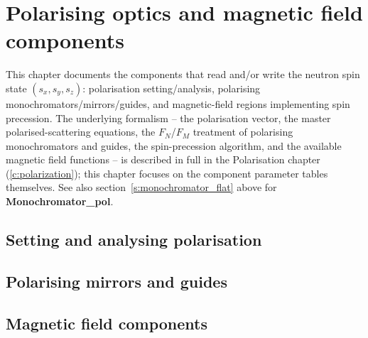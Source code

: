 \chapter{Polarising optics and magnetic field components}
\label{sec:polarising-optics}

This chapter documents the components that read and/or write the neutron
spin state $(s_x,s_y,s_z)$: polarisation setting/analysis, polarising
monochromators/mirrors/guides, and magnetic-field regions implementing
spin precession. The underlying formalism -- the polarisation vector,
the master polarised-scattering equations, the $F_N$/$F_M$ treatment of
polarising monochromators and guides, the spin-precession algorithm, and
the available magnetic field functions -- is described in full in the
Polarisation chapter (\ref{c:polarization}); this chapter
focuses on the component parameter tables themselves. See also
section~\ref{s:monochromator_flat} above for \textbf{Monochromator\_pol}.

\section{Setting and analysing polarisation}




\section{Polarising mirrors and guides}





\section{Magnetic field components}






\newpage

